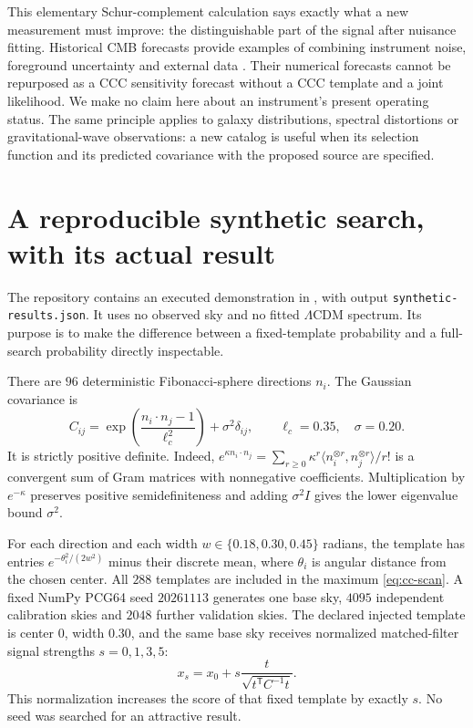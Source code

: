 This elementary Schur-complement calculation says exactly what a new
measurement must improve: the distinguishable part of the signal after
nuisance fitting. Historical CMB forecasts provide examples of combining
instrument noise, foreground uncertainty and external data
\citep[Sec.~2.6]{CCSimons2019}. Their numerical forecasts cannot be
repurposed as a CCC sensitivity forecast without a CCC template and a
joint likelihood. We make no claim here about an instrument's present
operating status. The same principle applies to galaxy distributions,
spectral distortions or gravitational-wave observations: a new catalog
is useful when its selection function and its predicted covariance with
the proposed source are specified.

\section{A reproducible synthetic search, with its actual result}
\label{sec:cc-synthetic}

The repository contains an executed demonstration in
, with output
\texttt{synthetic-results.json}. It uses no observed sky and no fitted
$\Lambda$CDM spectrum. Its purpose is to make the difference between a
fixed-template probability and a full-search probability directly
inspectable.

There are $96$ deterministic Fibonacci-sphere directions $n_i$.
The Gaussian covariance is
\begin{equation}
 C_{ij}=\exp\left(\frac{n_i\cdot n_j-1}{\ell_c^2}\right)
 +\sigma^2\delta_{ij},\qquad \ell_c=0.35,\quad\sigma=0.20.
 \label{eq:cc-toy-covariance}
\end{equation}
It is strictly positive definite. Indeed,
$e^{\kappa n_i\cdot n_j}=\sum_{r\ge0}\kappa^r
\langle n_i^{\otimes r},n_j^{\otimes r}\rangle/r!$ is a convergent
sum of Gram matrices with nonnegative coefficients. Multiplication by
$e^{-\kappa}$ preserves positive semidefiniteness and adding
$\sigma^2I$ gives the lower eigenvalue bound $\sigma^2$.

For each direction and each width $w\in\{0.18,0.30,0.45\}$ radians,
the template has entries
$e^{-\theta_i^2/(2w^2)}$ minus their discrete mean, where $\theta_i$
is angular distance from the chosen center. All $288$ templates are
included in the maximum \eqref{eq:cc-scan}. A fixed NumPy PCG64 seed
$20261113$ generates one base sky, $4095$ independent calibration skies
and $2048$ further validation skies. The declared injected template is
center $0$, width $0.30$, and the same base sky receives normalized
matched-filter signal strengths $s=0,1,3,5$:
\[
 x_s=x_0+s\frac{t}{\sqrt{t^{\mathsf T}C^{-1}t}}.
\]
This normalization increases the score of that fixed template by exactly
$s$. No seed was searched for an attractive result.

